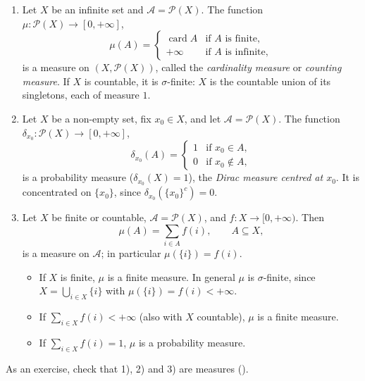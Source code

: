 \begin{example}\label{exa:ms-examples}
\leavevmode
\begin{enumerate}[label=\arabic*)]
  \item Let $X$ be an infinite set and $\mathcal A=\mathcal P(X)$. The function
    $\mu:\mathcal P(X)\to[0,+\infty]$,
    \[
      \mu(A)=\begin{cases}\operatorname{card}A&\text{if $A$ is finite},\\+\infty&\text{if $A$ is infinite},\end{cases}
    \]
    is a measure on $(X,\mathcal P(X))$, called the \emph{cardinality measure} or
    \emph{counting measure}. If $X$ is countable, it is $\sigma$-finite: $X$ is the countable
    union of its singletons, each of measure $1$.
  \item Let $X$ be a non-empty set, fix $x_0\in X$, and let $\mathcal A=\mathcal P(X)$. The
    function $\delta_{x_0}:\mathcal P(X)\to[0,+\infty]$,
    \[
      \delta_{x_0}(A)=\begin{cases}1&\text{if }x_0\in A,\\0&\text{if }x_0\notin A,\end{cases}
    \]
    is a probability measure ($\delta_{x_0}(X)=1$), the \emph{Dirac measure centred at $x_0$}.
    It is concentrated on $\{x_0\}$, since $\delta_{x_0}(\{x_0\}^c)=0$.
  \item Let $X$ be finite or countable, $\mathcal A=\mathcal P(X)$, and
    $f:X\to[0,+\infty)$. Then
    \[
      \mu(A)=\sum_{i\in A}f(i),\qquad A\subseteq X,
    \]
    is a measure on $\mathcal A$; in particular $\mu(\{i\})=f(i)$.
    \begin{itemize}
      \item If $X$ is finite, $\mu$ is a finite measure. In general $\mu$ is $\sigma$-finite,
        since $X=\bigcup_{i\in X}\{i\}$ with $\mu(\{i\})=f(i)<+\infty$.
      \item If $\sum_{i\in X}f(i)<+\infty$ (also with $X$ countable), $\mu$ is a finite measure.
      \item If $\sum_{i\in X}f(i)=1$, $\mu$ is a probability measure.
    \end{itemize}
\end{enumerate}
As an exercise, check that 1), 2) and 3) are measures ().
\end{example}

